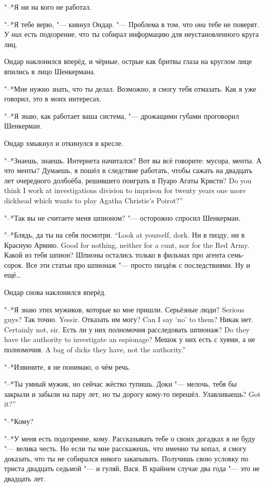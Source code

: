 "--*Я ни на кого не работал.

"--*Я тебе верю, "--- кивнул Ондар.
"--- Проблема в том, что \emph{они} тебе не поверят.
У \emph{них} есть подозрение, что ты собирал информацию для неустановленного круга лиц.

Ондар наклонился вперёд, и чёрные, острые как бритвы глаза на круглом лице впились в лицо Шенкермана.

"--*Мне нужно знать, что ты делал.
Возможно, я смогу тебя отмазать.
Как я уже говорил, это в моих интересах.

"--*Я знаю, как работает ваша система, "--- дрожащими губами проговорил Шенкерман.

Ондар хмыкнул и откинулся в кресле.

"--*Знаешь, знаешь.
Интернета начитался?
Вот вы всё говорите: мусора, менты.
А что менты?
{Думаешь, я пошёл в следствие работать, чтобы сажать на двадцать лет очередного долбоёба, решившего поиграть в Пуаро Агаты Кристи?}
{Do you think I work at investigations division to imprison for twenty years one more dickhead which wants to play Agatha Christie's Poirot?''}

"--*Так вы не считаете меня шпионом? "--- осторожно спросил Шенкерман.

{"--*Блядь, да ты на себя посмотри.}
{``Look at yourself, dork.}
{Ни в пизду, ни в Красную Армию.}
{Good for nothing, neither for a cunt, nor for the Red Army.}
Какой из тебя шпион?
Шпионы остались только в фильмах про агента семь-сорок.
Все эти статьи про шпионаж "--- просто пиздёж с последствиями.
Ну и ещё\ldots{}

Ондар снова наклонился вперёд.

"--*Я знаю этих мужиков, которые ко мне пришли.
{Серьёзные люди?}
{Serious guys?}
{Так точно.}
{Yessir.}
{Отказать им могу?}
{Can I say `no' to them?}
{Никак нет.}
{Certainly not, sir.}
{Есть ли у них полномочия расследовать шпионаж?}
{Do they have the authority to investigate an espionage?}
{Мешок у них есть с хуями, а не полномочия.}
{A bag of dicks they have, not the authority.''}

"--*Извините, я не понимаю, о чём речь.

"--*Ты умный мужик, но сейчас жёстко тупишь.
Доки "--- мелочь, тебя бы закрыли и забыли на пару лет, но ты дорогу кому-то перешёл.
{Улавливаешь?}
{Got it?''}

"--*Кому?

"--*У меня есть подозрение, кому.
Рассказывать тебе о своих догадках я не буду "--- велика честь.
Но если ты мне расскажешь, что именно ты копал, я смогу доказать, что ты не собирался никого закапывать.
Получишь свою условку по триста двадцать седьмой "--- и гуляй, Вася.
В крайнем случае два года "--- это не двадцать лет.

